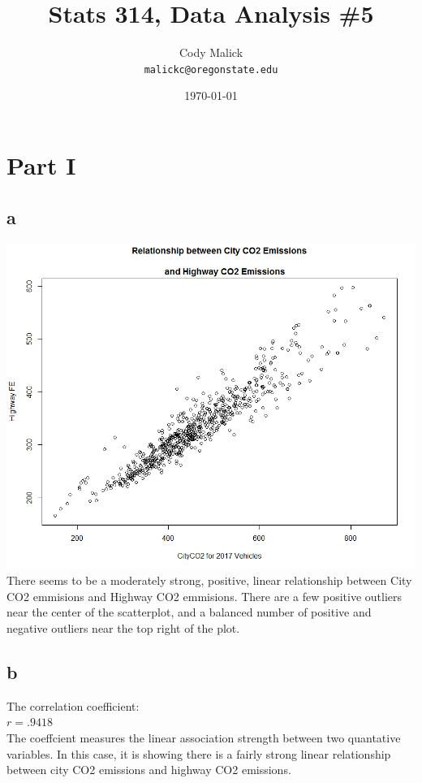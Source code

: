 \documentclass[10pt,letterpaper]{article}
\begin{document}
  \title{Stats 314, Data Analysis \#5}
  \author{Cody Malick\\
  \texttt{malickc@oregonstate.edu}}
  \date{\today}
  \maketitle

\section*{Part I}
\subsection*{a}
\includegraphics[scale=.6]{scatterplot}\\
There seems to be a moderately strong, positive, linear relationship between
City CO2
emmisions and Highway CO2 emmisions. There are a few positive outliers near the
center of the scatterplot, and a balanced number of positive and negative outliers
near the top right of the plot.


\subsection*{b}
The correlation coefficient:\\
$r=.9418$\\
The coeffcient measures the linear association strength between two quantative
variables. In this case, it is showing there is a fairly strong linear relationship
between city CO2 emissions and highway CO2 emissions.
\end{document}
